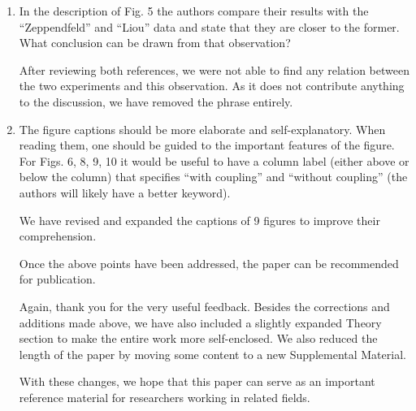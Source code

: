\documentclass[aps,prb,10pt,endfloats]{revtex4-1}
\begin{document}
\begin{enumerate}
\item
In the description of Fig. 5 the authors compare their results with the
``Zeppendfeld'' and ``Liou'' data and state that they are closer to the former.
What conclusion can be drawn from that observation?
\begin{shaded*}
After reviewing both references, we were not able to find any relation between
the two experiments and this observation. As it does not contribute anything to
the discussion, we have removed the phrase entirely.
\end{shaded*}

\item
The figure captions should be more elaborate and self-explanatory. When reading
them, one should be guided to the important features of the figure. For Figs. 6,
8, 9, 10 it would be useful to have a column label (either above or below the
column) that specifies ``with coupling'' and ``without coupling'' (the authors
will likely have a better keyword).
\begin{shaded*}
We have revised and expanded the captions of 9 figures to improve their
comprehension.
\end{shaded*}

Once the above points have been addressed, the paper can be recommended for
publication.
\begin{shaded*}
Again, thank you for the very useful feedback. Besides the corrections and
additions made above, we have also included a slightly expanded Theory section
to make the entire work more self-enclosed. We also reduced the length of the
paper by moving some content to a new Supplemental Material.

With these changes, we hope that this paper can serve as an important reference
material for researchers working in related fields.
\end{shaded*}

\end{enumerate}
\end{document}
